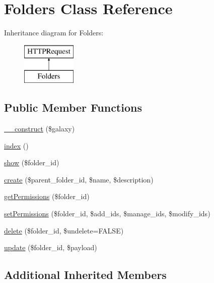 \hypertarget{classFolders}{}\section{Folders Class Reference}
\label{classFolders}
Inheritance diagram for Folders\+:\begin{figure}[H]
\begin{center}
\leavevmode
\includegraphics[height=2.000000cm]{classFolders}
\end{center}
\end{figure}
\subsection*{Public Member Functions}
\begin{DoxyCompactItemize}
\item 
\hyperlink{classFolders_a47219b896724ee4ac920d05cd87acf7d}{\+\_\+\+\_\+construct} (\$galaxy)
\item 
\hyperlink{classFolders_a109d9c4a860921d86ee2b892172c4cb7}{index} ()
\item 
\hyperlink{classFolders_a7ec1832769976e6192b010e8c93bdcea}{show} (\$folder\+\_\+id)
\item 
\hyperlink{classFolders_aee151f1b40f0a3ae61afb943469e5339}{create} (\$parent\+\_\+folder\+\_\+id, \$name, \$description)
\item 
\hyperlink{classFolders_a68817a94c13feb8112e4d518ca1f9b7d}{get\+Permissions} (\$folder\+\_\+id)
\item 
\hyperlink{classFolders_ab367992f8589996cf357d389045f06d5}{set\+Permissions} (\$folder\+\_\+id, \$add\+\_\+ids, \$manage\+\_\+ids, \$modify\+\_\+ids)
\item 
\hyperlink{classFolders_ae0ad5e1d1020ecd6542fe01c1dd4c573}{delete} (\$folder\+\_\+id, \$undelete=F\+A\+L\+SE)
\item 
\hyperlink{classFolders_aef4ad6a8938fbf0144d147169952a4c1}{update} (\$folder\+\_\+id, \$payload)
\end{DoxyCompactItemize}
\subsection*{Additional Inherited Members}


